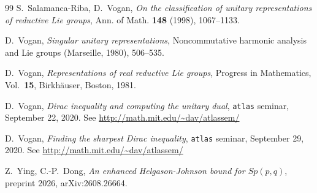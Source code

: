 \documentclass[11pt]{amsart}
\theoremstyle{plain}
\theoremstyle{definition}
\begin{document}
\begin{thebibliography}{99}
 S.~Salamanca-Riba, D.~Vogan, \emph{On the classification of unitary representations of reductive Lie groups}, Ann. of Math. \textbf{148} (1998), 1067--1133.
	
 D.~Vogan,
	\emph{Singular unitary representations},  Noncommutative harmonic
	analysis and Lie groups (Marseille, 1980),  506--535.
	
 D.~Vogan,
	\emph{Representations of real reductive Lie groups}, Progress in Mathematics, Vol.~\textbf{15}, Birkh\"auser, Boston, 1981.
	

 D.~Vogan,
\emph{Dirac inequality and computing the unitary dual}, \texttt{atlas} seminar, September 22, 2020.
See \url{http://math.mit.edu/~dav/atlassem/}

 D.~Vogan,
\emph{Finding the sharpest Dirac inequality}, \texttt{atlas} seminar, September 29, 2020.
See \url{http://math.mit.edu/~dav/atlassem/}

  Z.~Ying, C.-P.~Dong,
\emph{An enhanced Helgason-Johnson bound for $Sp(p, q)$},
preprint 2026, arXiv:2608.26664.
\end{thebibliography}
\end{document}
